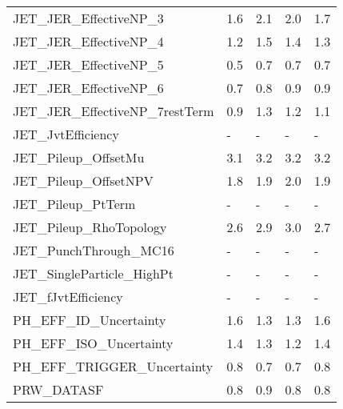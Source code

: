 \begin{table}[htbp]
{\begin{tabular}{lllll}
JET\_JER\_EffectiveNP\_3                     &   1.6 &   2.1 &   2.0 &   1.7 \\
JET\_JER\_EffectiveNP\_4                     &   1.2 &   1.5 &   1.4 &   1.3 \\
JET\_JER\_EffectiveNP\_5                     &   0.5 &   0.7 &   0.7 &   0.7 \\
JET\_JER\_EffectiveNP\_6                     &   0.7 &   0.8 &   0.9 &   0.9 \\
JET\_JER\_EffectiveNP\_7restTerm             &   0.9 &   1.3 &   1.2 &   1.1 \\
JET\_JvtEfficiency                         &     - &     - &     - &     - \\
JET\_Pileup\_OffsetMu                       &   3.1 &   3.2 &   3.2 &   3.2 \\
JET\_Pileup\_OffsetNPV                      &   1.8 &   1.9 &   2.0 &   1.9 \\
JET\_Pileup\_PtTerm                         &     - &     - &     - &     - \\
JET\_Pileup\_RhoTopology                    &   2.6 &   2.9 &   3.0 &   2.7 \\
JET\_PunchThrough\_MC16                     &     - &     - &     - &     - \\
JET\_SingleParticle\_HighPt                 &     - &     - &     - &     - \\
JET\_fJvtEfficiency                        &     - &     - &     - &     - \\
PH\_EFF\_ID\_Uncertainty                     &   1.6 &   1.3 &   1.3 &   1.6 \\
PH\_EFF\_ISO\_Uncertainty                    &   1.4 &   1.3 &   1.2 &   1.4 \\
PH\_EFF\_TRIGGER\_Uncertainty                &   0.8 &   0.7 &   0.7 &   0.8 \\
PRW\_DATASF                                &   0.8 &   0.9 &   0.8 &   0.8 \\
\end{tabular}

}

\end{table}

